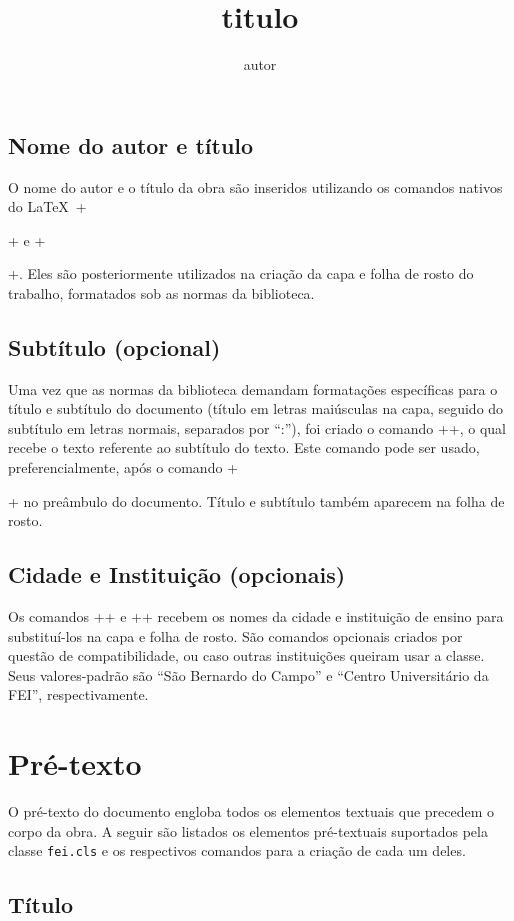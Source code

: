 \documentclass[xindy,rascunho]{fei}
\begin{document}
	\subsection{Nome do autor e título}
	
	O nome do autor e o título da obra são inseridos utilizando os comandos nativos do \LaTeX\ \latexinline+\author{autor}+ e \latexinline+\title{titulo}+. Eles são posteriormente utilizados na criação da capa e folha de rosto do trabalho, formatados sob as normas da biblioteca.

    \subsection{Subtítulo (opcional)}
    
    Uma vez que as normas da biblioteca demandam formatações específicas para o título e subtítulo do documento (título em letras maiúsculas na capa, seguido do subtítulo em letras normais, separados por ``:''), foi criado o comando \latexinline+\subtitulo{}+, o qual recebe o texto referente ao subtítulo do texto. Este comando pode ser usado, preferencialmente, após o comando \latexinline+\title{}+ no preâmbulo do documento. Título e subtítulo também aparecem na folha de rosto.
    
    \subsection{Cidade e Instituição (opcionais)}
    Os comandos \latexinline+\cidade{}+ e \latexinline+\instituicao{}+ recebem os nomes da cidade e instituição de ensino para substituí-los na capa e folha de rosto. São comandos opcionais criados por questão de compatibilidade, ou caso outras instituições queiram usar a classe. Seus valores-padrão são ``São Bernardo do Campo'' e ``Centro Universitário da FEI'', respectivamente.
   
   \section{Pré-texto}\label{sec:pretexto}
   
   O pré-texto do documento engloba todos os elementos textuais que precedem o corpo da obra. A seguir são listados os elementos pré-textuais suportados pela classe \texttt{fei.cls} e os respectivos comandos para a criação de cada um deles.
   
   \subsection{Título}
   
\end{document}
